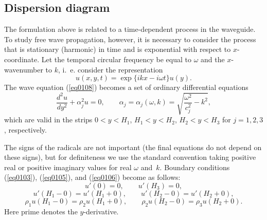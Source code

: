 \documentclass[12pt]{article}
\begin{document}

\subsection{Dispersion diagram}
\label{sec_diagram}

The formulation above is related to a time-dependent process in the waveguide. To study 
free wave propagation, however, it is necessary to consider the process that is stationary 
(harmonic) in time and is exponential with respect to $x$-coordinate. Let the  
temporal circular frequency be equal to $\omega$ and the $x$-wavenumber to $k$, i.~e. consider 
the representation 
\begin{equation}
u(x,y,t) = \exp \{ i k x - i \omega t \} u (y).
\label{eq0107}
\end{equation}
The wave equation (\ref{eq0108})  becomes a set of ordinary differential equations 
\begin{equation}
\frac{d^2 u}{d y^2} + \alpha_j^2 u = 0 ,
\qquad
\alpha_j = 
\alpha_j (\omega, k)=
\sqrt{\frac{\omega^2}{c_j^2} - k^2}, 
\label{eq0108}
\end{equation}
which are valid in the strips $0<y<H_1$, $H_1<y<H_2$, $H_2<y<H_3$ for $j = 1,2,3$, respectively.  


The signs of the radicals are not important (the final equations do not depend on these signs), 
but for definiteness we use the standard convention  
taking positive real or positive imaginary values for real $\omega$ and~$k$.
Boundary conditions (\ref{eq0103}), (\ref{eq0105}), and (\ref{eq0106})
become as follows: 
\begin{equation}
u'(0)= 0, 
\qquad 
u'(H_3)= 0, 
\label{eq0109}
\end{equation}
\begin{equation}
u' (H_1-0) = 
u' (H_1+0) ,
\qquad 
u' (H_2-0) = 
u' (H_2+0), 
\label{eq0110}
\end{equation}
\begin{equation}
\rho_1 u(H_1-0) = 
\rho_2 u(H_1+0) ,
\qquad 
\rho_2 u(H_2-0) = 
\rho_3 u(H_2+0) 
.
\label{eq0111}
\end{equation}
Here prime denotes the $y$-derivative.
\end{document}
